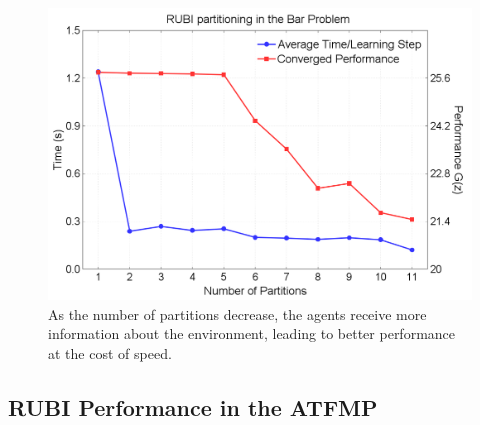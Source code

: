 \documentclass[letterpaper]{article}
\begin{document}
\begin{figure}
\centering
\includegraphics[width=.75\columnwidth]{BarProblemComparisonNoScale}
\caption{As the number of partitions decrease, the agents receive more information about the environment, leading to better performance at the cost of speed. }
\label{BarProblemNewPartitions}
\end{figure}


\subsection{RUBI Performance in the ATFMP}
\end{document}
